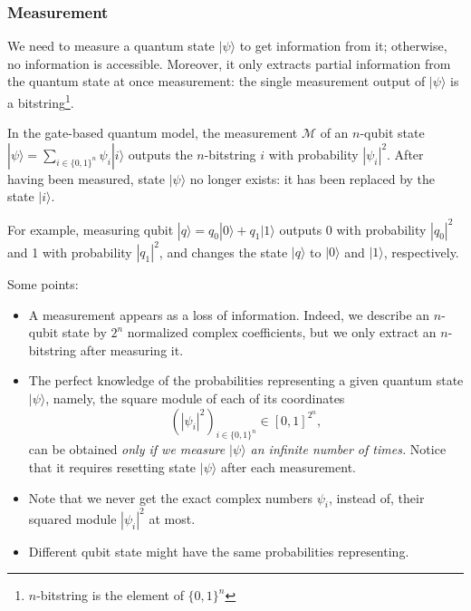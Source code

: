 \subsubsection{Measurement} %

We need to measure a quantum state $|\psi\rangle$ to get information from it; otherwise, no information is accessible.
Moreover, it only extracts partial information from the quantum state at once measurement: the single measurement output of  $|\psi\rangle$ is a bitstring\footnote{$n$-bitstring is the element of $\{0,1\}^{n}$}.

\begin{definition}[Measurement]
    In the gate-based quantum model, the measurement $\mathcal{M}$ of an $n$-qubit state $|\psi\rangle=\sum_{i \in\{0,1\}^{n}} \psi_{i}|i\rangle$ outputs the $n$-bitstring $i$ with probability $\left|\psi_{i}\right|^{2}$. After having been measured, state $|\psi\rangle$ no longer exists: it has been replaced by the state $|i\rangle$.
\end{definition}

\begin{example}
    For example, measuring qubit $|q\rangle=q_{0}|0\rangle+q_{1}|1\rangle$ outputs 0 with probability $\left|q_{0}\right|^{2}$ and 1 with probability $\left|q_{1}\right|^{2}$, and changes the state $|q\rangle$ to $|0\rangle$ and $|1\rangle$, respectively.  %
\end{example}

Some points:
\begin{itemize}
    \item A measurement appears as a loss of information. Indeed, we describe an $n$-qubit state by $2^{n}$ normalized complex coefficients, but we only extract an $n$-bitstring after measuring it.
    \item The perfect knowledge of the probabilities representing a given quantum state $|\psi\rangle$, namely, the square module of each of its coordinates 
    \begin{equation}
    \left(\left|\psi_{i}\right|^{2}\right)_{i \in\{0,1\}^{n}} \in[0,1]^{2^{n}},
\end{equation}
can be obtained \textit{only if we measure $|\psi\rangle$ an infinite number of times.} Notice that it requires resetting state $|\psi\rangle$ after each measurement.
    \item Note that we never get the exact complex numbers $\psi_{i}$, instead of, their squared module $\left|\psi_{i}\right|^{2}$ at most.
    \item Different qubit state might have the same probabilities representing.
\end{itemize}

